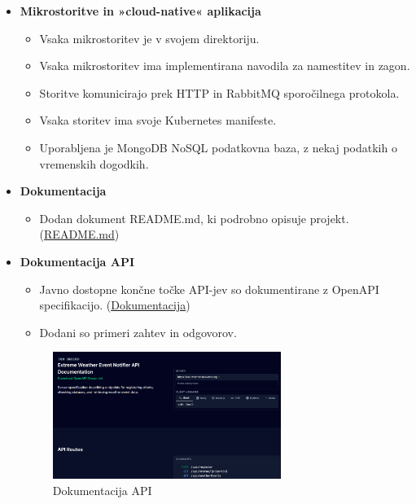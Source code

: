 \documentclass[a4paper,11pt]{article}
\begin{document}
\begin{itemize}
	\item \textbf{Mikrostoritve in »cloud-native« aplikacija}
	      \begin{itemize}
	      	\item Vsaka mikrostoritev je v svojem direktoriju.
	      	\item Vsaka mikrostoritev ima implementirana navodila za namestitev in zagon.
	      	\item Storitve komunicirajo prek HTTP in RabbitMQ sporočilnega protokola.
	      	\item Vsaka storitev ima svoje Kubernetes manifeste.
	      	\item Uporabljena je MongoDB NoSQL podatkovna baza, z nekaj podatkih o vremenskih dogodkih.
	      \end{itemize}
	\item \textbf{Dokumentacija}
	      \begin{itemize}
	      	\item Dodan dokument README.md, ki podrobno opisuje projekt. (\href{https://github.com/rso2425/extreme-weather-event-notifier/blob/main/README.md}{README.md})
	      \end{itemize}
	\item \textbf{Dokumentacija API}
	      \begin{itemize}
	      	\item Javno dostopne končne točke API-jev so dokumentirane z OpenAPI specifikacijo. (\href{https://rso-weather.duckdns.org/docs/tag/api-routes}{Dokumentacija})
	      	\item Dodani so primeri zahtev in odgovorov.
	      \end{itemize}
	      
	      \begin{figure}[h!]
	      	\centering
	      	\includegraphics[width=0.7\textwidth]{images/openapi.png}
	      	\caption{Dokumentacija API}
	      	\label{fig:openapi}
	      \end{figure}
	              

\end{itemize}
\end{document}
